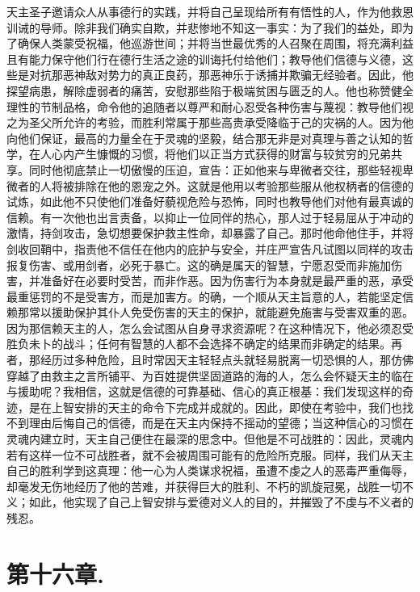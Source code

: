 天主圣子邀请众人从事德行的实践，并将自己呈现给所有有悟性的人，作为他救恩训诫的导师。除非我们确实自欺，并悲惨地不知这一事实：为了我们的益处，即为了确保人类蒙受祝福，他巡游世间；并将当世最优秀的人召聚在周围，将充满利益且有能力保守他们行在德行生活之途的训诲托付给他们；教导他们信德与义德，这些是对抗那恶神敌对势力的真正良药，那恶神乐于诱捕并欺骗无经验者。因此，他探望病患，解除虚弱者的痛苦，安慰那些陷于极端贫困与匮乏的人。他也称赞健全理性的节制品格，命令他的追随者以尊严和耐心忍受各种伤害与蔑视：教导他们视之为圣父所允许的考验，而胜利常属于那些高贵承受降临于己的灾祸的人。因为他向他们保证，最高的力量全在于灵魂的坚毅，结合那无非是对真理与善之认知的哲学，在人心内产生慷慨的习惯，将他们以正当方式获得的财富与较贫穷的兄弟共享。同时他彻底禁止一切傲慢的压迫，宣告：正如他来与卑微者交往，那些轻视卑微者的人将被排除在他的恩宠之外。这就是他用以考验那些服从他权柄者的信德的试炼，如此他不只使他们准备好藐视危险与恐怖，同时也教导他们对他有最真诚的信赖。有一次他也出言责备，以抑止一位同伴的热心，那人过于轻易屈从于冲动的激情，持剑攻击，急切想要保护救主性命，却暴露了自己。那时他命他住手，并将剑收回鞘中，指责他不信任在他内的庇护与安全，并庄严宣告凡试图以同样的攻击报复伤害、或用剑者，必死于暴亡。这的确是属天的智慧，宁愿忍受而非施加伤害，并准备好在必要时受苦，而非作恶。因为伤害行为本身就是最严重的恶，承受最重惩罚的不是受害方，而是加害方。的确，一个顺从天主旨意的人，若能坚定信赖那常以援助保护其仆人免受伤害的天主的保护，就能避免施害与受害双重的恶。因为那信赖天主的人，怎么会试图从自身寻求资源呢？在这种情况下，他必须忍受胜负未卜的战斗；任何有智慧的人都不会选择不确定的结果而非确定的结果。再者，那经历过多种危险，且时常因天主轻轻点头就轻易脱离一切恐惧的人，那仿佛穿越了由救主之言所铺平、为百姓提供坚固道路的海的人，怎么会怀疑天主的临在与援助呢？我相信，这就是信德的可靠基础、信心的真正根基：我们发现这样的奇迹，是在上智安排的天主的命令下完成并成就的。因此，即使在考验中，我们也找不到理由后悔自己的信德，而是在天主内保持不摇动的望德；当这种信心的习惯在灵魂内建立时，天主自己便住在最深的思念中。但他是不可战胜的：因此，灵魂内若有这样一位不可战胜者，就不会被周围可能有的危险所克服。同样，我们从天主自己的胜利学到这真理：他一心为人类谋求祝福，虽遭不虔之人的恶毒严重侮辱，却毫发无伤地经历了他的苦难，并获得巨大的胜利、不朽的凯旋冠冕，战胜一切不义；如此，他实现了自己上智安排与爱德对义人的目的，并摧毁了不虔与不义者的残忍。\par


\section{第十六章. }

